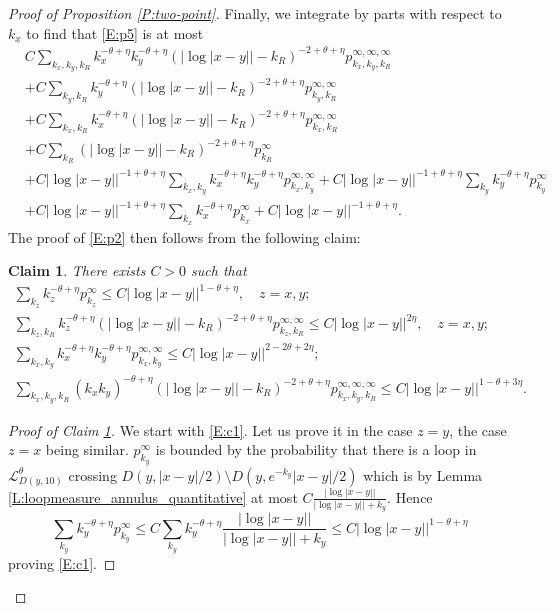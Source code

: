 \documentclass[11pt]{article}
\newtheorem{claim}[theorem]{Claim}
\theoremstyle{remark}
\newcommand{\Lc}{\mathcal{L}}
\numberwithin{equation}{section}
\begin{document}
\begin{proof}[Proof of Proposition \ref{P:two-point}]
Finally, we integrate by parts with respect to $k_x$ to find that \eqref{E:p5} is at most
\begin{align*}
& C \sum_{k_x,k_y,k_R} k_x^{-\theta+\eta} k_y^{-\theta+\eta} ( |\log |x-y|| - k_R )^{-2+\theta + \eta} p_{k_x,k_y,k_R}^{\infty,\infty,\infty} \\
& + C \sum_{k_y,k_R} k_y^{-\theta+\eta} ( |\log |x-y|| - k_R )^{-2+\theta + \eta} p_{k_y,k_R}^{\infty,\infty} \\
& + C \sum_{k_x,k_R} k_x^{-\theta+\eta} ( |\log |x-y|| - k_R )^{-2+\theta + \eta} p_{k_x,k_R}^{\infty,\infty} \\
& + C \sum_{k_R} ( |\log |x-y|| - k_R )^{-2+\theta + \eta} p_{k_R}^{\infty} \\
& + C |\log|x-y||^{-1+\theta+\eta} \sum_{k_x,k_y} k_x^{-\theta+\eta} k_y^{-\theta+\eta} p_{k_x,k_y}^{\infty,\infty}
+ C |\log|x-y||^{-1+\theta+\eta} \sum_{k_y} k_y^{-\theta+\eta} p_{k_y}^{\infty} \\
& + C |\log|x-y||^{-1+\theta+\eta} \sum_{k_x} k_x^{-\theta+\eta} p_{k_x}^{\infty}
+ C |\log|x-y||^{-1+\theta+\eta}.
\end{align*}
The proof of \eqref{E:p2} then follows from the following claim:

\begin{claim}\label{claim}
There exists $C>0$ such that
\begin{gather}
\label{E:c1}
\sum_{k_z} k_z^{-\theta+\eta} p_{k_z}^{\infty} \leq C |\log|x-y||^{1-\theta+\eta}, \quad z = x,y; \\
\label{E:c2}
\sum_{k_z,k_R} k_z^{-\theta+\eta} ( |\log |x-y|| - k_R )^{-2+\theta + \eta} p_{k_z,k_R}^{\infty,\infty} \leq C |\log |x-y||^{2\eta}, \quad z=x,y; \\
\label{E:c3}
\sum_{k_x,k_y} k_x^{-\theta+\eta} k_y^{-\theta+\eta} p_{k_x,k_y}^{\infty,\infty}
\leq C |\log|x-y||^{2-2\theta+2\eta}; \\
\label{E:c4}
\sum_{k_x,k_y,k_R} (k_x k_y)^{-\theta+\eta} ( |\log |x-y|| - k_R )^{-2+\theta + \eta} p_{k_x,k_y,k_R}^{\infty,\infty,\infty} \leq C |\log|x-y||^{1-\theta+3\eta}.
\end{gather}
\end{claim}

\begin{proof}[Proof of Claim \ref{claim}]
We start with \eqref{E:c1}. Let us prove it in the case $z=y$, the case $z=x$ being similar.
$p_{k_y}^\infty$ is bounded by the probability that there is a loop in $\Lc_{D(y,10)}^\theta$ crossing $D(y,|x-y|/2) \setminus D(y,e^{-k_y}|x-y|/2)$ which is by Lemma \ref{L:loopmeasure_annulus_quantitative} at most $C \frac{|\log|x-y||}{|\log|x-y||+k_y}$. Hence
\[
\sum_{k_y} k_y^{-\theta+\eta} p_{k_y}^{\infty} \leq C \sum_{k_y} k_y^{-\theta+\eta} \frac{|\log|x-y||}{|\log|x-y||+k_y} \leq C |\log|x-y||^{1-\theta+\eta}
\]
proving \eqref{E:c1}.


\end{proof}
\end{proof}
\end{document}
